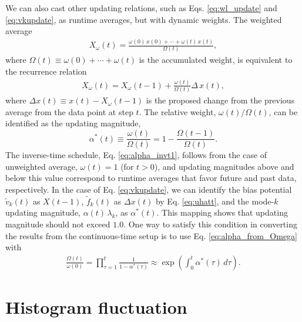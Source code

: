 \documentclass[preprint, superscriptaddress, floatfix]{revtex4-1}
\begin{document}
We can also cast other updating relations,
such as Eqs. \eqref{eq:wl_update}
and \eqref{eq:vkupdate},
as runtime averages,
but with dynamic weights.
%
The weighted average
%
\begin{align*}
  X_\omega(t)
  =
  \frac{
    \omega(0) \, x(0) + \cdots + \omega(t) \, x(t)
  }
  {
    \Omega(t)
  }
  ,
\end{align*}
%
where
$\Omega(t) \equiv \omega(0) + \cdots + \omega(t)$
is the accumulated weight,
is equivalent to the recurrence relation
%
\begin{align*}
X_\omega(t) = X_\omega(t-1)
  + \frac{\omega(t)}{\Omega(t)}
  \Delta \, x(t)
,
\end{align*}
where
$\Delta x(t) \equiv x(t) - X_\omega(t-1)$
is the proposed change from the previous average
from the data point at step $t$.
%
The relative weight, $\omega(t)/\Omega(t)$,
can be identified as the updating magnitude,
\begin{equation}
  \alpha^*(t) \equiv
  \frac{ \omega(t) } {\Omega(t)}
  =
  1 - \frac{ \Omega(t-1) } {\Omega(t)}
  .
  \label{eq:alpha_from_Omega}
\end{equation}
%
The inverse-time schedule, Eq. \eqref{eq:alpha_invt1},
follows from the case of unweighted average,
$\omega(t) = 1$ (for $t > 0$),
and updating magnitudes above and below this value
correspond to runtime averages that favor future and past data,
respectively.
%
In the case of Eq. \eqref{eq:vkupdate},
we can identify
the bias potential $\tilde v_k(t)$
as $X(t-1)$,
$\tilde f_k(t)$ as $\Delta x(t)$
by Eq. \eqref{eq:uhatt},
and
the mode-$k$ updating magnitude,
$\alpha(t) \, \lambda_k$,
as $\alpha^*(t)$.
%
This mapping shows that
updating magnitude should not exceed $1.0$.
%
One way to satisfy this condition
in converting the results
from the continuous-time setup is
to use Eq. \eqref{eq:alpha_from_Omega}
with
\begin{align*}
  \frac{ \Omega(t) } { \omega(0) }
  = \prod_{\tau=1}^t \frac{1}{1- \alpha^*(\tau)}
\approx \exp\left(\int_0^t \alpha^*(\tau) \, d\tau \right).
\end{align*}








\section{\label{sec:hfluc}
Histogram fluctuation}
\end{document}
